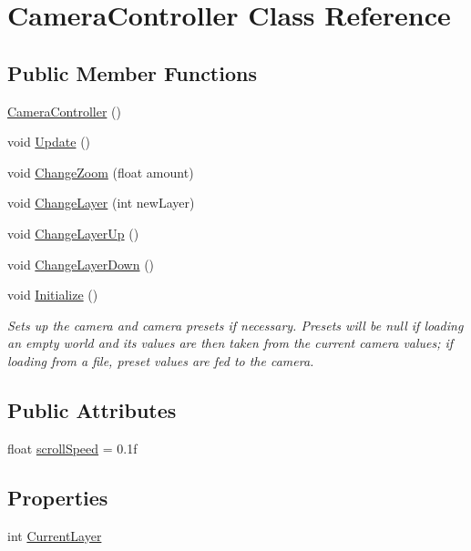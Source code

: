 \hypertarget{class_camera_controller}{}\section{Camera\+Controller Class Reference}
\label{class_camera_controller}
\subsection*{Public Member Functions}
\begin{DoxyCompactItemize}
\item 
\hyperlink{class_camera_controller_a2028264f95bb29ae3a0fbd3255e3c401}{Camera\+Controller} ()
\item 
void \hyperlink{class_camera_controller_a7c4f486f4bcbd1d54a346fdce9707bd5}{Update} ()
\item 
void \hyperlink{class_camera_controller_a5685e1f13b68e97d726cbb9ee92c55f7}{Change\+Zoom} (float amount)
\item 
void \hyperlink{class_camera_controller_a490a2f66c60adedcb74d3b3cde07275d}{Change\+Layer} (int new\+Layer)
\item 
void \hyperlink{class_camera_controller_aea1f76fa7604667f1442dc48be81fb2a}{Change\+Layer\+Up} ()
\item 
void \hyperlink{class_camera_controller_a3861db0c5202a3efc51ac3a87546d1db}{Change\+Layer\+Down} ()
\item 
void \hyperlink{class_camera_controller_a8c7b57499a5e204821e54bd705fb3f05}{Initialize} ()
\begin{DoxyCompactList}\small\item\em Sets up the camera and camera presets if necessary. Presets will be null if loading an empty world and its values are then taken from the current camera values; if loading from a file, preset values are fed to the camera. \end{DoxyCompactList}\end{DoxyCompactItemize}
\subsection*{Public Attributes}
\begin{DoxyCompactItemize}
\item 
float \hyperlink{class_camera_controller_a8507cbd7f4030221961ef08e2e39a2bc}{scroll\+Speed} = 0.\+1f
\end{DoxyCompactItemize}
\subsection*{Properties}
\begin{DoxyCompactItemize}
\item 
int \hyperlink{class_camera_controller_a2ca9b5b3b41679613229d313a22243d2}{Current\+Layer}
\end{DoxyCompactItemize}
